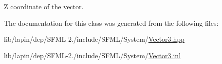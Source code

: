 Z coordinate of the vector. 



The documentation for this class was generated from the following files\-:\begin{DoxyCompactItemize}
\item 
lib/lapin/dep/\-S\-F\-M\-L-\/2./include/\-S\-F\-M\-L/\-System/\hyperlink{lapin_2dep_2_s_f_m_l-2_83_2include_2_s_f_m_l_2_system_2_vector3_8hpp}{Vector3.\-hpp}\item 
lib/lapin/dep/\-S\-F\-M\-L-\/2./include/\-S\-F\-M\-L/\-System/\hyperlink{lapin_2dep_2_s_f_m_l-2_83_2include_2_s_f_m_l_2_system_2_vector3_8inl}{Vector3.\-inl}\end{DoxyCompactItemize}
